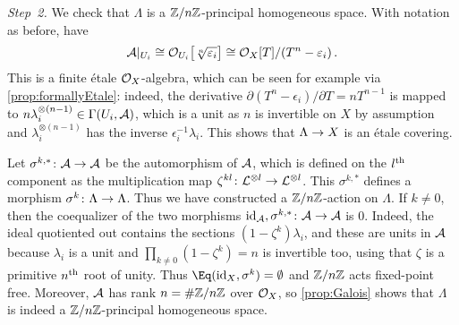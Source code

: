 \begin{proof*}
	\emph{Step~2.} We check that $\Lambda$ is a $\mathbb{Z}/n\mathbb{Z}$-principal homogeneous space. With notation as before, have 
	\begin{equation*}
		\mathcal{A}|_{U_i}\cong \mathcal{O}_{U_i}\big[\sqrt[n]{\varepsilon_i}\big]\cong \mathcal{O}_X[T]/(T^n-\varepsilon_i)\,.
	\end{equation*}
	This is a finite étale $\mathcal{O}_X$-algebra, which can be seen for example via \cref{prop:formallyEtale}: indeed, the derivative $\partial(T^n-\epsilon_i)/\partial T=n T^{n-1}$ is mapped to $n\lambda_i^{\otimes(n-1)}\in \operatorname{\Gamma}(U_i,\mathcal{A})$, which is a unit as $n$ is invertible on $X$ by assumption and $\lambda_i^{\otimes (n-1)}$ has the inverse $\epsilon_i^{-1}\lambda_i$. This shows that $\Lambda\morphism X$ is an étale covering.
	
	Let $\sigma^{k,*}\colon \Aa\morphism\Aa$ be the automorphism of $\mathcal{A}$, which is defined on the $l^{\text{th}}$ component as the multiplication map $\zeta^{kl}\colon \Ll^{\otimes l}\morphism \Ll^{\otimes l}$. This $\sigma^{k,*}$ defines a morphism $\sigma^k\colon \Lambda\morphism\Lambda$. Thus we have constructed a $\mathbb{Z}/n\mathbb{Z}$-action on $\Lambda$. If $k\neq 0$, then the coequalizer of the two morphisms $\id_\Aa,\sigma^{k,*}\colon \Aa\morphism\Aa$ is $0$. Indeed, the ideal quotiented out contains the sections $(1-\zeta^k)\lambda_i$, and these are units in $\mathcal{A}$ because $\lambda_i$ is a unit and $\prod_{k\neq 0}(1-\zeta^k)=n$ is invertible too, using that $\zeta$ is a primitive $n^{\text{th}}$ root of unity. Thus $\Eq(\id_X,\sigma^k)=\emptyset$ and $\mathbb{Z}/n\mathbb{Z}$ acts fixed-point free. Moreover, $\mathcal{A}$ has rank $n=\#\mathbb{Z}/n\mathbb{Z}$ over $\mathcal{O}_X$, so \cref{prop:Galois} shows that $\Lambda$ is indeed a $\mathbb{Z}/n\mathbb{Z}$-principal homogeneous space.
	

\end{proof*}
